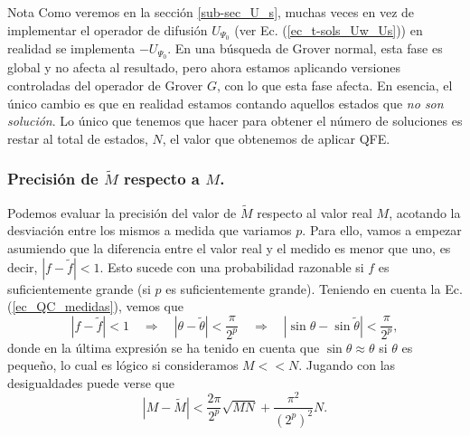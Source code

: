 \documentclass[a4paper,11pt]{article} %
\numberwithin{equation}{section}
\def\rqa{\quad \Rightarrow \quad}
\begin{document}
	\begin{mybox}{Nota}
	Como veremos en la sección \ref{sub-sec_U_s}, muchas veces en vez de implementar el operador de 
	difusión $U_{\Psi_0}$ (ver Ec. (\ref{ec_t-sols_Uw_Us})) en realidad se implementa $-U_{\Psi_0}$. 
	En una búsqueda de Grover normal, esta fase es global 
	y no afecta al resultado, pero ahora estamos aplicando versiones controladas del operador de Grover 
	$G$, con lo que esta fase afecta. En esencia, el único cambio es que en realidad estamos contando 
	aquellos estados que \textit{no son solución}. Lo único que tenemos que hacer para obtener el número 
	de soluciones es restar al total de estados, $N$, el valor que obtenemos de aplicar QFE. 
	\end{mybox}

\subsubsection{Precisión de $\tilde{M}$ respecto a $M$.}

Podemos evaluar la precisión del valor de $\tilde{M}$ respecto al valor real $M$, acotando la desviación entre los mismos a medida que variamos $p$. Para ello, vamos a empezar asumiendo que la diferencia entre el valor real y el medido es menor que uno, es decir, $| f- \tilde{f}| <1$. Esto sucede con una probabilidad razonable si $f$ es suficientemente grande (si $p$ es suficientemente grande). Teniendo en cuenta la Ec. (\ref{ec_QC_medidas}), vemos que
\begin{equation*}
| f- \tilde{f}| < 1 \rqa | \theta - \tilde{\theta}| < \frac{\pi}{2^p} \rqa | \sin \theta - \sin \tilde{\theta}| < \frac{\pi}{2^p},
\end{equation*}
donde en la última expresión se ha tenido en cuenta que $\sin \theta \approx \theta$ si $\theta$ es pequeño, lo cual es lógico si consideramos $M << N$. Jugando con las desigualdades puede verse que
\begin{equation} \label{ec_QC_error}
\boxed{|M - \tilde{M}| <   \frac{2 \pi}{2^p} \sqrt{M N} + \frac{\pi^2}{(2^p)^2} N}.
\end{equation}
\end{document}
